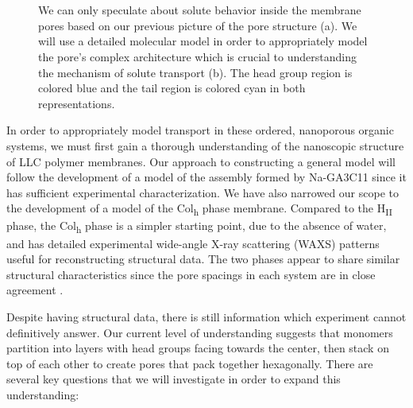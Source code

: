 \documentclass{article}
\begin{document}
\begin{figure}
\begin{subfigure}{0.45\linewidth}
		\caption{}~\label{fig:detailed_pore}
	\end{subfigure}
  \caption{We can only speculate about solute behavior inside the membrane
	  pores based on our previous picture of the pore structure (a). We will use a
	  detailed molecular model in order to appropriately model the pore's complex
	  architecture which is crucial to understanding the mechanism of solute
	  transport (b). The head group region is colored blue
	  and the tail region is colored cyan in both representations.}~\label{fig:detail}
  \end{figure}
 
  In order to appropriately model transport in these ordered, nanoporous
  organic systems, we must first gain a thorough understanding of the nanoscopic
  structure of LLC polymer membranes. Our approach to constructing a general
  model will follow the development of a model of the assembly formed by
  Na-GA3C11 since it has sufficient experimental characterization. We have also
  narrowed our scope to the development of a model of the Col\textsubscript{h}
  phase membrane. Compared to the H\textsubscript{II} phase, the
  Col\textsubscript{h} phase is a simpler starting point, due to the absence of
  water, and has detailed experimental wide-angle X-ray scattering (WAXS)
  patterns useful for reconstructing structural data. The two phases appear to
  share similar structural characteristics since the pore spacings in each system
  are in close agreement \cite{feng_thin_2016,resel_structural_2000}.

  Despite having structural data, there is still information which experiment
  cannot definitively answer. Our current level of understanding suggests that
  monomers partition into layers with head groups facing towards the center, then 
  stack on top of each other to create pores that pack together hexagonally.
  There are several key questions that we will investigate in order to
  expand this understanding:
 
\end{document}
